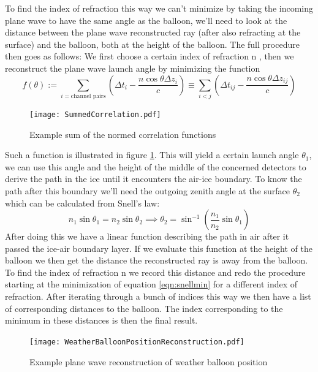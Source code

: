 To find the index of refraction this way we can't minimize by taking the
incoming plane wave to have the same angle as the balloon, we'll need to look
at the distance between the plane wave reconstructed ray (after also refracting
at the surface) and the balloon, both at the height of the balloon.  The full
procedure then goes as follows: We first choose a certain index of refraction n
, then we reconstruct the plane wave launch angle by minimizing the function
\begin{equation}
	f(\theta) := \sum_{i=\text{channel pairs}}\left( \Delta t_i - \frac{n\cos\theta \Delta z_i}{c}\right) \equiv \sum_{i<j}\left( \Delta t_{ij} - \frac{n\cos\theta \Delta z_{ij}}{c}\right)\label{eqn:snellmin}
\end{equation}
\begin{figure}
	\centering
	\texttt{[image: SummedCorrelation.pdf]}
	\caption{Example sum of the normed correlation functions}
	\label{fig:SummedCorrelation}
\end{figure}
Such a function is illustrated in figure \ref{fig:SummedCorrelation}.  This
will yield a certain launch angle $\theta_1$, we can use this angle and the
height of the middle of the concerned detectors to derive the path in the ice
until it encounters the air-ice boundary.  To know the path after this boundary
we'll need the outgoing zenith angle at the surface $\theta_2$ which can be
calculated from Snell's law:
\begin{equation}
	n_1 \sin{\theta_1} = n_2 \sin{\theta_2} \implies  \theta_2 = \sin^{-1}\left(\frac{n_1}{n_2}\sin{\theta_1}\right)
\end{equation}
After doing this we have a linear function describing the path in air after it
passed the ice-air boundary layer.  If we evaluate this function at the height
of the balloon we then get the distance the reconstructed ray is away from the
balloon.  To find the index of refraction n we record this distance and redo
the procedure starting at the minimization of equation \ref{eqn:snellmin} for a
different index of refraction. After iterating through a bunch of indices this way
we then have a list of corresponding distances to the balloon. The index
corresponding to the minimum in these distances is then the final result.
\begin{figure}
	\centering
	\texttt{[image: WeatherBalloonPositionReconstruction.pdf]}
	\caption{Example plane wave reconstruction of weather balloon position}
	\label{fig:WeatherBalloonPositionReconstruction}
\end{figure}
